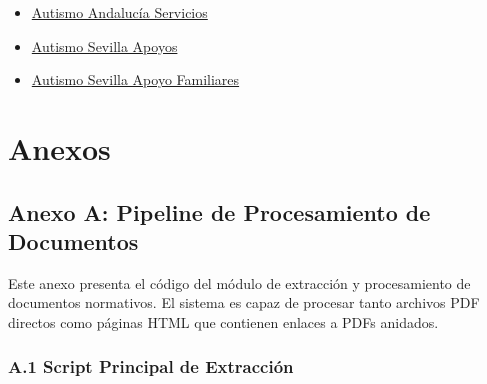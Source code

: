 \documentclass[a4paper,12pt]{article}
\begin{document}
\begin{itemize}
\item \href{https://www.autismoandalucia.org/autismo/servicios-y-recursos/}{Autismo Andalucía Servicios}

\item \href{https://www.autismosevilla.org/apoyos-individualizados.php}{Autismo Sevilla Apoyos}

\item \href{https://www.autismosevilla.org/blog/programas-de-apoyo-para-familiares-cuidadores-de-personas-con-tea/}{Autismo Sevilla Apoyo Familiares}
\end{itemize}
\newpage
\section*{Anexos}

\subsection*{Anexo A: Pipeline de Procesamiento de Documentos}

Este anexo presenta el código del módulo de extracción y procesamiento de documentos normativos. El sistema es capaz de procesar tanto archivos PDF directos como páginas HTML que contienen enlaces a PDFs anidados.

\subsubsection*{A.1 Script Principal de Extracción}
\end{document}
